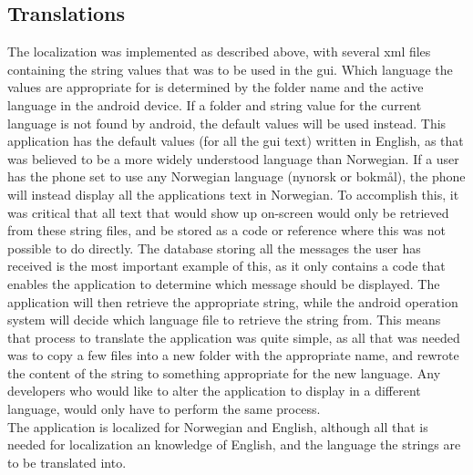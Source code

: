 
\subsection{Translations}

The localization was implemented as described above, with several xml files containing the string values that was to be used in the gui.  Which language the values are appropriate for is determined by the folder name and the active language in the android device. If a folder and string value for the current language is not found by android, the default values will be used instead. This application has the default values (for all the gui text) written in English, as that was believed to be a more widely understood language than Norwegian. If a user has the phone set to use any Norwegian language (nynorsk or bokmål), the phone will instead display all the applications text in Norwegian. To accomplish this, it was critical that all text that would show up on-screen would only be retrieved from these string files, and be stored as a code or reference where this was not possible to do directly. The database storing all the messages the user has received is the most important example of this, as it only contains a code that enables the application to determine which message should be displayed. The application will then retrieve the appropriate string, while the android operation system will decide which language file to retrieve the string from. This means that process to translate the application was quite simple, as all that was needed was to copy a few files into a new folder with the appropriate name, and rewrote the content of the string to something appropriate for the new language. Any developers who would like to alter the application to display in a different language, would only have to perform the same process. \\
The application is localized for Norwegian and English, although all that is needed for localization an knowledge of English, and the language the strings are to be translated into. 